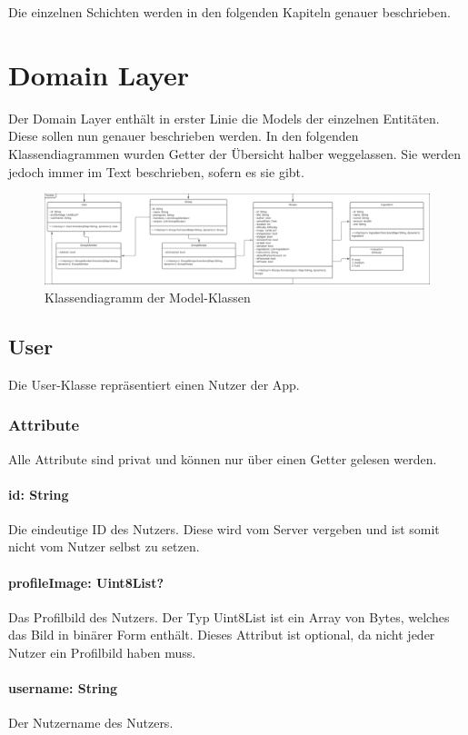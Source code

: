 \documentclass[parskip=full]{scrartcl}
\newcommand{\changelocaltocdepth}[1]{%
  \addtocontents{toc}{\protect\setcounter{tocdepth}{#1}}%
  \setcounter{tocdepth}{#1}%
}
\begin{document}
Die einzelnen Schichten werden in den folgenden Kapiteln genauer beschrieben.

\newpage

\section{Domain Layer}
\changelocaltocdepth{2}
Der Domain Layer enthält in erster Linie die Models der einzelnen Entitäten. Diese sollen nun genauer beschrieben werden. In den folgenden Klassendiagrammen wurden Getter der Übersicht halber weggelassen. Sie werden jedoch immer im Text beschrieben, sofern es sie gibt.
\begin{figure}[htp]
    \centering
    \includegraphics[width = \textwidth]{images/domainLayer/domainLayer.pdf}
    \caption{Klassendiagramm der Model-Klassen}
    \label{fig:domain-layer}
\end{figure}

\subsection{User}
Die User-Klasse repräsentiert einen Nutzer der App.
\subsubsection{Attribute}
Alle Attribute sind privat und können nur über einen Getter gelesen werden.
\paragraph{id: String}
Die eindeutige ID des Nutzers. Diese wird vom Server vergeben und ist somit nicht vom Nutzer selbst zu setzen.
\paragraph{profileImage: Uint8List?}
Das Profilbild des Nutzers. Der Typ Uint8List ist ein Array von Bytes, welches das Bild in binärer Form enthält. Dieses Attribut ist optional, da nicht jeder Nutzer ein Profilbild haben muss.
\paragraph{username: String}
Der Nutzername des Nutzers.
\end{document}
